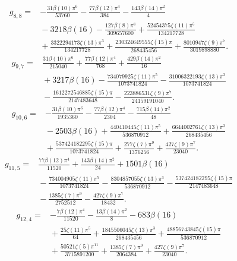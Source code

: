 \begin{align*}g_{8,8}={}&- \frac{31 \beta(10) \pi^{6}}{53760}- \frac{77 \beta(12) \pi^{4}}{384}- \frac{143 \beta(14) \pi^{2}}{4}\\
&{}- 3218 \beta(16)- \frac{127 \beta(8) \pi^{8}}{309657600}+\frac{52454375 \zeta(11) \pi^{5}}{134217728}\\
&{}+\frac{3322294173 \zeta(13) \pi^{3}}{134217728}+\frac{230324649555 \zeta(15) \pi}{268435456}+\frac{8010947 \zeta(9) \pi^{7}}{3019898880}.\end{align*}
\begin{align*}g_{9,7}={}&\frac{31 \beta(10) \pi^{6}}{215040}+\frac{77 \beta(12) \pi^{4}}{768}+\frac{429 \beta(14) \pi^{2}}{16}\\
&{}+3217 \beta(16)- \frac{734079925 \zeta(11) \pi^{5}}{1073741824}- \frac{31006322193 \zeta(13) \pi^{3}}{1073741824}\\
&{}- \frac{1612272546885 \zeta(15) \pi}{2147483648}- \frac{223886531 \zeta(9) \pi^{7}}{24159191040}.\end{align*}
\begin{align*}g_{10,6}={}&- \frac{31 \beta(10) \pi^{6}}{1935360}- \frac{77 \beta(12) \pi^{4}}{2304}- \frac{715 \beta(14) \pi^{2}}{48}\\
&{}- 2503 \beta(16)+\frac{440410445 \zeta(11) \pi^{5}}{536870912}+\frac{6644002761 \zeta(13) \pi^{3}}{268435456}\\
&{}+\frac{537424182295 \zeta(15) \pi}{1073741824}+\frac{277 \zeta(7) \pi^{9}}{1376256}+\frac{427 \zeta(9) \pi^{7}}{23040}.\end{align*}
\begin{align*}g_{11,5}={}&\frac{77 \beta(12) \pi^{4}}{11520}+\frac{143 \beta(14) \pi^{2}}{24}+1501 \beta(16)\\
&{}- \frac{734004905 \zeta(11) \pi^{5}}{1073741824}- \frac{8304857055 \zeta(13) \pi^{3}}{536870912}- \frac{537424182295 \zeta(15) \pi}{2147483648}\\
&{}- \frac{1385 \zeta(7) \pi^{9}}{2752512}- \frac{427 \zeta(9) \pi^{7}}{18432}.\end{align*}
\begin{align*}g_{12,4}={}&- \frac{7 \beta(12) \pi^{4}}{11520}- \frac{13 \beta(14) \pi^{2}}{8}- 683 \beta(16)\\
&{}+\frac{25 \zeta(11) \pi^{5}}{64}+\frac{1845506045 \zeta(13) \pi^{3}}{268435456}+\frac{48856743845 \zeta(15) \pi}{536870912}\\
&{}+\frac{50521 \zeta(5) \pi^{11}}{3715891200}+\frac{1385 \zeta(7) \pi^{9}}{2064384}+\frac{427 \zeta(9) \pi^{7}}{23040}.\end{align*}
